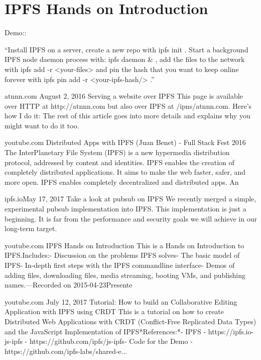 \section{IPFS Hands on Introduction}

Demo:: {``Install IPFS on a server, create a new repo with ipfs init
. Start a background IPFS node daemon process with: ipfs daemon \& ,
add the files to the network with ipfs add -r <your-files> and pin the
hash that you want to keep online forever with ipfs pin add -r
<your-ipfs-hash/> .''

atnnn.com August 2, 2016
Serving a website over IPFS
This page is available over HTTP at http://atnnn.com but also over
IPFS at /ipns/atnnn.com. Here’s how I do it: The rest of this article
goes into more details and explains why you might want to do it too.

youtube.com Distributed Apps with IPFS (Juan Benet) - Full Stack Fest
2016 The InterPlanetary File System (IPFS) is a new hypermedia
distribution protocol, addressed by content and identities. IPFS
enables the creation of completely distributed applications. It aims
to make the web faster, safer, and more open. IPFS enables completely
decentralized and distributed apps. An

ipfs.ioMay 17, 2017 Take a look at pubsub on IPFS We recently merged a
simple, experimental pubsub implementation into IPFS. This
implementation is just a beginning. It is far from the performance and
security goals we will achieve in our long-term target.

youtube.com
IPFS Hands on Introduction
This is a Hands on Introduction to IPFS.Includes:- Discussion on the problems IPFS solves- The basic model of IPFS- In-depth first steps with the IPFS commandline interface- Demos of adding files, downloading files, media streaming, booting VMs, and publishing names.---Recorded on 2015-04-23Presente

youtube.com July 12, 2017 Tutorial: How to build an Collaborative
Editing Application with IPFS using CRDT This is a tutorial on how to
create Distributed Web Applications with CRDT (Conflict-Free
Replicated Data Types) and the JavaScript Implementation of
IPFS*References:*- IPFS - https://ipfs.io- js-ipfs -
https://github.com/ipfs/js-ipfs- Code for the Demo -
https://github.com/ipfs-labs/shared-e...  

}

